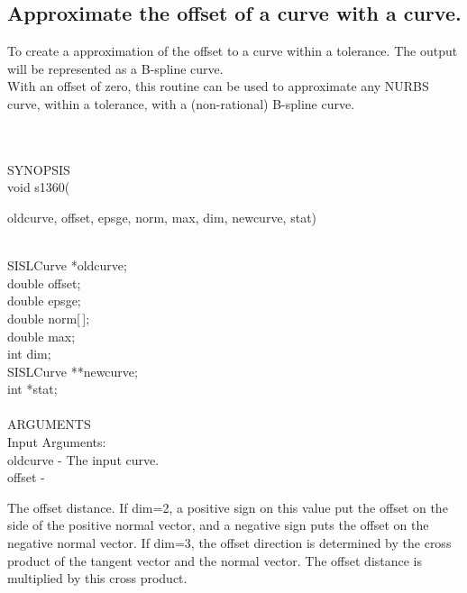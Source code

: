 \subsection{Approximate the offset of a curve with a curve.}
\begin{minipg1}
  To create a approximation of the offset to a curve within a
  tolerance.
  The output will be represented as a B-spline curve.\\
  With an offset of zero, this routine can be used to approximate any
  NURBS curve, within a tolerance, with a (non-rational) B-spline curve.
\end{minipg1} \\ \\
SYNOPSIS\\
        \>void s1360(\begin{minipg3}
        {\fov oldcurve}, {\fov offset}, {\fov epsge}, {\fov norm}, {\fov max}, {\fov dim}, {\fov newcurve}, {\fov stat})
                \end{minipg3}\\[0.3ex]
                \>\>    SISLCurve       \>      *{\fov oldcurve};\\
                \>\>    double  \>      {\fov offset};\\
                \>\>    double  \>      {\fov epsge};\\
                \>\>    double  \>      {\fov norm}[\,];\\
                \>\>    double  \>      {\fov max};\\
                \>\>    int     \>      {\fov dim};\\
                \>\>    SISLCurve       \>      **{\fov newcurve};\\
                \>\>    int     \>      *{\fov stat};\\
\\
ARGUMENTS\\
        \>Input Arguments:\\
        \>\>    {\fov oldcurve}\> - \> The input curve.\\
        \>\>    {\fov offset}   \> - \> \begin{minipg2}
                        The offset distance. If dim=2, a positive sign on
                        this value put the offset on the side of the positive
                        normal vector, and a negative sign puts the offset on
                        the negative normal vector. If dim=3, the offset direction is
                        determined by the cross product of the tangent
                        vector and the normal vector. The offset distance is
                        multiplied by this cross product.
                                \end{minipg2}\\[0.8ex]
